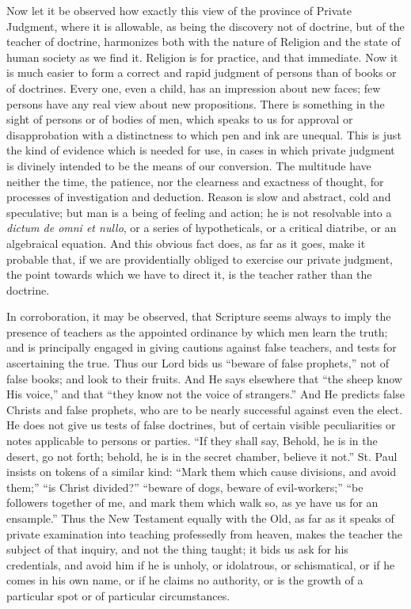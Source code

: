 Now let it be observed how exactly this view of the province of
Private Judgment, where it is allowable, as being the discovery not of
doctrine, but of the teacher of doctrine, harmonizes both with the
nature of Religion and the state of human society as we find it.
Religion is for practice, and that immediate. Now it is much easier to
form a correct and rapid judgment of persons than of books or of
doctrines. Every one, even a child, has an impression about new faces;
few persons have any real view about new propositions. There is
something in the sight of persons or of bodies of men, which speaks to
us for approval or disapprobation with a distinctness to which pen and
ink are unequal. This is just the kind of evidence which is needed for
use, in cases in which private judgment is divinely intended to be the
means of our conversion. The multitude have neither the time, the
patience, nor the clearness and exactness of thought, for processes of
investigation and deduction. Reason is slow and abstract, cold and
speculative; but man is a being of feeling and action; he is not
resolvable into a \emph{dictum de omni et nullo}, or a series of
hypotheticals, or a critical diatribe, or an algebraical equation. And
this obvious fact does, as far as it goes, make it probable
that, if we are providentially obliged to exercise our private
judgment, the point towards which we have to direct it, is the teacher
rather than the doctrine.

In corroboration, it may be observed, that Scripture seems always
to imply the presence of teachers as the appointed ordinance by which
men learn the truth; and is principally engaged in giving cautions
against false teachers, and tests for ascertaining the true. Thus our
Lord bids us ``beware of false prophets,'' not of false books;
and look to their fruits. And He says elsewhere that ``the sheep
know His voice,'' and that ``they know not the voice of
strangers.'' And He predicts false Christs and false prophets, who
are to be nearly successful against even the elect. He does not give
us tests of false doctrines, but of certain visible peculiarities or
notes applicable to persons or parties. ``If they shall say,
Behold, he is in the desert, go not forth; behold, he is in the secret
chamber, believe it not.'' St. Paul insists on tokens of a similar
kind: ``Mark them which cause divisions, and avoid them;''
``is Christ divided?'' ``beware of dogs, beware of
evil-workers;'' ``be followers together of me, and mark them
which walk so, as ye have us for an ensample.'' Thus the New
Testament equally with the Old, as far as it speaks of private
examination into teaching professedly from heaven, makes the teacher
the subject of that inquiry, and not the thing taught; it bids us ask
for his credentials, and avoid him if he is unholy, or idolatrous, or
schismatical, or if he comes in his own name, or if he claims no
authority, or is the growth of a particular spot or of particular
circumstances.

